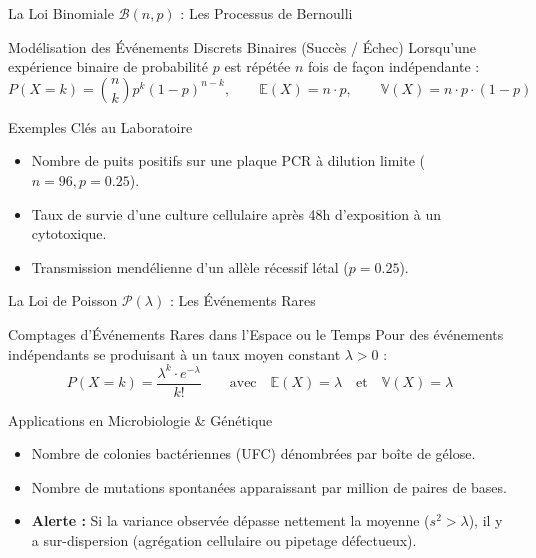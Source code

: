 \documentclass[aspectratio=169,10pt]{beamer}
\begin{document}
\begin{frame}{La Loi Binomiale $\mathcal{B}(n, p)$ : Les Processus de Bernoulli}
  \begin{conceptbox}{Modélisation des Événements Discrets Binaires (Succès / Échec)}
    Lorsqu'une expérience binaire de probabilité $p$ est répétée $n$ fois de façon indépendante :
    \begin{equation*}
      P(X = k) = \binom{n}{k} p^k (1 - p)^{n - k}, \qquad \mathbb{E}(X) = n \cdot p, \qquad \mathbb{V}(X) = n \cdot p \cdot (1 - p)
    \end{equation*}
  \end{conceptbox}
  \vspace{1.5mm}
  \begin{biobox}{Exemples Clés au Laboratoire}
    \begin{itemize}\setlength{\itemsep}{1.5pt}
      \item Nombre de puits positifs sur une plaque PCR à dilution limite ($n=96, p=0.25$).
      \item Taux de survie d'une culture cellulaire après 48h d'exposition à un cytotoxique.
      \item Transmission mendélienne d'un allèle récessif létal ($p=0.25$).
    \end{itemize}
  \end{biobox}
\end{frame}

\begin{frame}{La Loi de Poisson $\mathcal{P}(\lambda)$ : Les Événements Rares}
  \begin{conceptbox}{Comptages d'Événements Rares dans l'Espace ou le Temps}
    Pour des événements indépendants se produisant à un taux moyen constant $\lambda > 0$ :
    \begin{equation*}
      P(X = k) = \frac{\lambda^k \cdot e^{-\lambda}}{k!} \qquad \text{avec} \quad \mathbb{E}(X) = \lambda \quad \text{et} \quad \mathbb{V}(X) = \lambda
    \end{equation*}
  \end{conceptbox}
  \vspace{1.5mm}
  \begin{biobox}{Applications en Microbiologie \& Génétique}
    \begin{itemize}\setlength{\itemsep}{1.5pt}
      \item Nombre de colonies bactériennes (UFC) dénombrées par boîte de gélose.
      \item Nombre de mutations spontanées apparaissant par million de paires de bases.
      \item \textbf{Alerte :} Si la variance observée dépasse nettement la moyenne ($s^2 > \lambda$), il y a sur-dispersion (agrégation cellulaire ou pipetage défectueux).
    \end{itemize}
  \end{biobox}
\end{frame}
\end{document}
